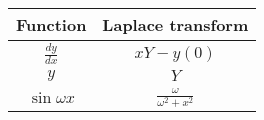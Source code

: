 \begin{tabular}{|c|c|} 
      \hline
\textbf{Function} & \textbf{Laplace transform}\\\hline
         $\frac{dy}{dx}$& $xY-y(0)$ \\\hline
          $y$&$Y$\\\hline
          $\sin{\omega x}$& $\frac{\omega}{\omega^2+x^2}$  \\ \hline
    \end{tabular}
